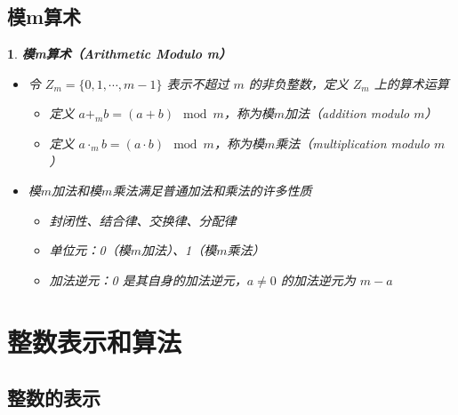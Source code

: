 \documentclass[UTF8]{report}
\theoremstyle{MyLineTheoremStyle} %
\theoremstyle{MyBlockTheoremStyle} %
\theoremstyle{MySubsubsectionStyle} %
\newtheorem{definition}{}
\begin{document}
\subsection{模m算术}

\begin{definition}
    \textbf{模m算术（Arithmetic Modulo m）}
    \begin{itemize}
        \item 令 $Z_m = \{0, 1, \cdots, m - 1\}$ 表示不超过 $m$ 的非负整数，定义 $Z_m$ 上的算术运算
        \begin{itemize}
            \item 定义 $a +_m b = (a + b) \mod m$，称为模$m$加法（addition modulo $m$）
            \item 定义 $a \cdot_m b = (a \cdot b) \mod m$，称为模$m$乘法（multiplication modulo $m$）
        \end{itemize}
        \item 模$m$加法和模$m$乘法满足普通加法和乘法的许多性质
        \begin{itemize}
            \item 封闭性、结合律、交换律、分配律
            \item 单位元：0（模$m$加法）、1（模$m$乘法）
            \item 加法逆元：0 是其自身的加法逆元，$a \neq 0$ 的加法逆元为 $m - a$
        \end{itemize}
    \end{itemize}
\end{definition}

\section{整数表示和算法}

\subsection{整数的表示}
\end{document}
